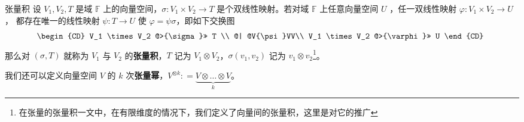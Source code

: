 
\begin{issues}
\issueDraft
\end{issues}


\begin{definition}{张量积}\label{def_vecTsr_1}
设 $V_1, V_2,T$ 是域 $\mathbb F$ 上的向量空间，$\sigma: V_1 \times V_2 \rightarrow T$ 是个双线性映射。若对域 $\mathbb F$ 上任意向量空间 $U$ ，任一双线性映射 $\varphi:V_1\times V_2\rightarrow U$， 都存在唯一的线性映射 $\psi:T\rightarrow U$ 使 $\varphi=\psi\sigma$，即如下交换图
\begin{equation}
\begin{CD}
V_1 \times V_2 @>{\sigma}>> T \\
@| @V{\psi}VV\\
V_1 \times V_2 @>{\varphi}>> U
\end{CD}~
\end{equation}
那么对 $(\sigma, T)$ 就称为 $V_1$ 与 $V_2$ 的\textbf{张量积}，$T$ 记为 $V_1 \otimes V_2$，$\sigma(v_1, v_2)$ 记为 $v_1 \otimes v_2$\footnote{在张量的张量积一文中，在有限维度的情况下，我们定义了向量间的张量积，这里是对它的推广}。

我们还可以定义向量空间 $V$ 的 $k$ 次\textbf{张量幂}，$V^{\otimes k}: = \underbrace{V \otimes \dots \otimes V}_k$。
\end{definition}

